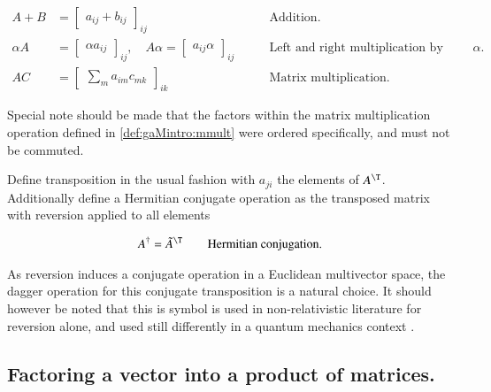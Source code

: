 \begin{definition}
\begin{subequations}
\begin{align}\label{eqn:gaMintro:mp90}
A + B &= 
{\begin{bmatrix}
a_{ij} + b_{ij}
\end{bmatrix}}_{ij} & \qquad \mbox{Addition.} 
\\
\alpha A &= 
{\begin{bmatrix}
\alpha a_{ij} 
\end{bmatrix}}_{ij}, \quad
A \alpha = 
{\begin{bmatrix}
a_{ij} \alpha
\end{bmatrix}}_{ij}
& \qquad \mbox{Left and right multiplication by multivector $\alpha$.} 
\\
A C &= 
{\begin{bmatrix}
\sum_m 
a_{im} c_{mk} 
\end{bmatrix}}_{ik} & \qquad \mbox{Matrix multiplication.} \label{def:gaMintro:mmult}
\end{align}
\end{subequations}
\end{definition}

Special note should be made that the factors within the matrix multiplication operation defined in \ref{def:gaMintro:mmult} were ordered specifically, and must not be commuted.

Define transposition in the usual fashion with $a_{ji}$ the elements of $A^\T$.  Additionally define a Hermitian conjugate operation as the transposed matrix with reversion applied to all elements

\begin{definition}
\begin{align}\label{eqn:gaMintro:mp100}
A^\dagger = {\tilde{A}}^\T \qquad \mbox{Hermitian conjugation.}
\end{align}
\end{definition}

As reversion induces a conjugate operation in a Euclidean multivector space, the dagger operation for this conjugate transposition is a natural choice.  It should however be noted that this is symbol is used in non-relativistic literature \cite{hestenes1999nfc} for reversion alone, and used still differently in a quantum mechanics context \cite{doran2003gap}.

\subsection{Factoring a vector into a product of matrices.}

